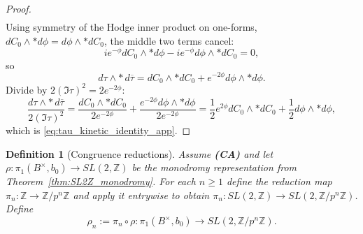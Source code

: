 \documentclass[11pt]{article}
\newtheorem{definition}[theorem]{Definition}
\theoremstyle{remark}
\begin{document}
{\begin{proof}
\begin{align}
\end{align}
Using symmetry of the Hodge inner product on one-forms, $dC_0\wedge *d\phi=d\phi\wedge *dC_0$, the middle two terms cancel:
\begin{equation}\label{eq:cross_terms_cancel}
i e^{-\phi}dC_0\wedge *d\phi-i e^{-\phi}d\phi\wedge *dC_0=0,
\end{equation}
so
\begin{equation}\label{eq:dtau_simplified}
d\tau\wedge *\,d\overline{\tau}=dC_0\wedge *dC_0+e^{-2\phi}d\phi\wedge *d\phi.
\end{equation}
Divide by $2(\Im\tau)^2=2e^{-2\phi}$:
\begin{equation}\label{eq:divide_by_Im}
\frac{d\tau\wedge *\,d\overline{\tau}}{2(\Im\tau)^2}
=\frac{dC_0\wedge *dC_0}{2e^{-2\phi}}+\frac{e^{-2\phi}d\phi\wedge *d\phi}{2e^{-2\phi}}
=\frac{1}{2}e^{2\phi}dC_0\wedge *dC_0+\frac{1}{2}d\phi\wedge *d\phi,
\end{equation}
which is \eqref{eq:tau_kinetic_identity_app}.
\end{proof} 
\begin{definition}[Congruence reductions]\label{def:rho_n_def}
Assume \textbf{(CA)} and let $\rho:\pi_1(B^\times,b_0)\to SL(2,\mathbb{Z})$ be the monodromy representation from Theorem~\ref{thm:SL2Z_monodromy}. For each $n\ge 1$ define the reduction map $\pi_n:\mathbb{Z}\to \mathbb{Z}/p^n\mathbb{Z}$ and apply it entrywise to obtain $\pi_n:SL(2,\mathbb{Z})\to SL(2,\mathbb{Z}/p^n\mathbb{Z})$. Define
\begin{equation}\label{eq:rho_n_def_app}
\rho_n:=\pi_n\circ \rho:\pi_1(B^\times,b_0)\to SL(2,\mathbb{Z}/p^n\mathbb{Z}).
\end{equation}
\end{definition}

}
\end{document}
